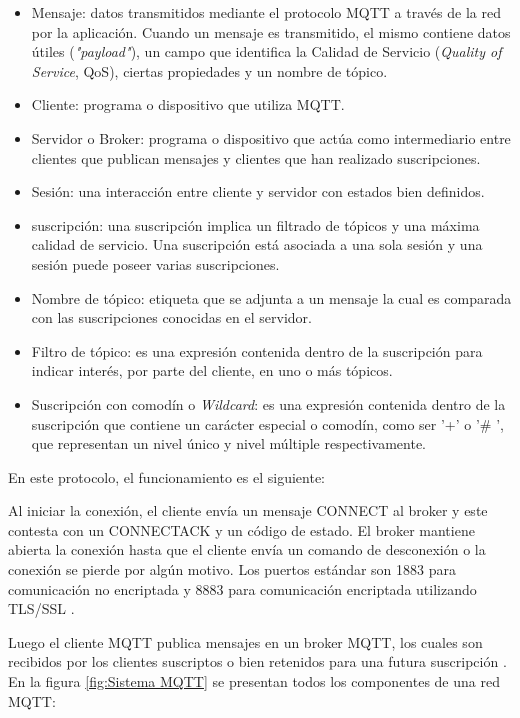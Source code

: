 \begin{itemize}
\item Mensaje: datos transmitidos mediante el protocolo MQTT  a través de la red por la aplicación. Cuando un mensaje es transmitido, el mismo contiene datos útiles (\textit{"payload"}), un campo que identifica la Calidad de Servicio (\textit{Quality of Service}, QoS), ciertas propiedades y un nombre de tópico.
\item Cliente: programa o dispositivo que utiliza MQTT.
\item Servidor o Broker: programa o dispositivo que actúa como intermediario entre clientes que publican mensajes y clientes que han realizado suscripciones.
\item Sesión: una interacción entre cliente y servidor con estados bien definidos.
\item suscripción: una  suscripción implica un filtrado de tópicos y una máxima calidad de servicio. Una suscripción está asociada a una sola sesión y una sesión puede poseer varias suscripciones.
\item Nombre de tópico: etiqueta que se adjunta a un mensaje la cual es comparada con las suscripciones conocidas en el servidor.
\item Filtro de tópico: es una expresión contenida dentro de la suscripción para indicar interés, por parte del cliente, en uno o más tópicos.
\item Suscripción con comodín o \textit{Wildcard}: es una expresión contenida dentro de la suscripción que contiene un carácter especial o comodín, como ser '+' o '\# ', que representan un nivel único y nivel múltiple respectivamente.

\end{itemize}

En este protocolo, el funcionamiento es el siguiente: 

Al iniciar la conexión, el cliente envía un mensaje CONNECT al broker y este contesta con un CONNECTACK y un código de estado. El broker mantiene abierta la conexión hasta que el cliente envía un comando de desconexión o la conexión se pierde por algún motivo. Los puertos estándar son 1883 para comunicación no encriptada y 8883 para comunicación encriptada utilizando TLS/SSL \citep{ARTICLE:4}.

Luego el cliente MQTT publica mensajes en un broker MQTT, los cuales son recibidos por los clientes suscriptos o bien retenidos para una futura suscripción \citep{WEBSITE:5}. En la figura \ref{fig:Sistema MQTT} se presentan todos los componentes de una red MQTT:  

